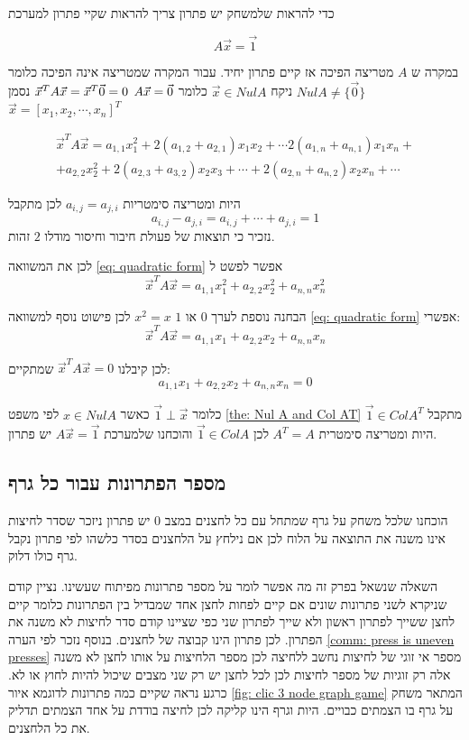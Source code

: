 \documentclass[12pt,leqno]{article}
\begin{document}
כדי להראות שלמשחק יש פתרון 
צריך להראות שקיי פתרון למערכת

\[A \vec{x} = \vec{1} \]

במקרה ש 
$A$
מטריצה הפיכה אז קיים פתרון יחיד.
עבור המקרה שמטריצה אינה הפיכה 
כלומר 
$Nul A \neq \{ \vec{0}\}$
ניקח 
$\vec{x} \in Nul A$
כלומר 
$A\vec{x} = \vec{0} \\$
$\vec{x}^T A \vec{x} = \vec{x}^T\vec{0} = 0 \\$
נסמן 
$\vec{x} = [x_1, x_2, \cdots, x_n]^T$

\begin{multline}
    \label{eq: quadratic form}
        \vec{x}^T A \vec{x} = a_{1,1}x_1^2 + 2(a_{1,2} + a_{2,1})x_1x_2 + \cdots 2(a_{1,n} + a_{n,1})x_1x_n + \\
        + a_{2,2}x_2^2 +  2(a_{2,3} + a_{3,2})x_2x_3 + \cdots  + 2(a_{2,n} + a_{n,2})x_2x_n + \cdots
\end{multline}

היות ומטריצה סימטריות
$a_{i,j} = a_{j,i}$
לכן
מתקבל
\[a_{i,j} - a_{j,i} = a_{i,j} + \cdots + a_{j,i} = 1 \]
נזכיר כי תוצאות של פעולת חיבור וחיסור מודלו 
$2$
זהות.

לכן
את המשוואה 
\ref{eq: quadratic form}
אפשר לפשט ל
\[ \vec{x}^T A \vec{x} = a_{1,1}x_1^2 + a_{2,2} x_2^2 +  a_{n,n} x_n^2\]

הבחנה נוספת לערך 
$0$
או
$1$
$x^2 = x$
לכן פישוט נוסף למשוואה 
\ref{eq: quadratic form}
אפשרי:
\[ \vec{x}^T A \vec{x} = a_{1,1}x_1 + a_{2,2} x_2 +  a_{n,n} x_n\]

לכן קיבלנו 
$ \vec{x}^T A \vec{x} = 0$
שמתקיים:
\[a_{1,1}x_1 + a_{2,2} x_2 +  a_{n,n} x_n = 0\]

כלומר 
$\vec{1} \perp  \vec{x}$
כאשר 
$x \in Nul A$
לפי משפט 
\ref{the: Nul A and Col AT}
מתקבל 
$\vec{1} \in Col A^T$
היות ומטריצה סימטרית 
$A^T = A$
לכן
$\vec{1} \in Col A$
והוכחנו שלמערכת
$A\vec{x} = \vec{1}$
יש פתרון.

\subsection{מספר הפתרונות עבור כל גרף}
הוכחנו שלכל משחק על גרף שמתחל עם כל לחצנים במצב 
$0$
יש פתרון ניזכר שסדר לחיצות
אינו משנה את התוצאה על הלוח לכן אם נילחץ על הלחצנים בסדר כלשהו 
לפי פתרון נקבל גרף כולו דלוק.

השאלה  שנשאל בפרק זה מה אפשר לומר על מספר פתרונות מפיתוח שעשינו.
נציין קודם שניקרא לשני פתרונות שונים אם קיים לפחות לחצן אחד שמבדיל בין הפתרונות 
כלומר קיים לחצן ששייך לפתרון ראשון ולא שייך לפתרון שני כפי שציינו קודם סדר
לחיצות לא משנה את הפתרון.
לכן פתרון הינו קבוצה של לחצנים.
בנוסף נזכר לפי הערה
\ref{comm: press is uneven presses}
מספר אי זוגי של לחיצות נחשב ללחיצה לכן מספר הלחיצות על אותו לחצן לא משנה 
אלה רק זוגיות של מספר לחיצות 
לכן לכל לחצן יש רק שני מצבים שיכול להיות 
לחוץ 
או לא.
כרגע נראה שקיים כמה פתרונות לדוגמא 
איור
\ref{fig: clic 3 node graph game}
המתאר משחק על גרף בו הצמתים כבויים.
היות וגרף הינו קליקה לכן לחיצה בודדת על אחד הצמתים תדליק את כל הלחצנים.
\end{document}
